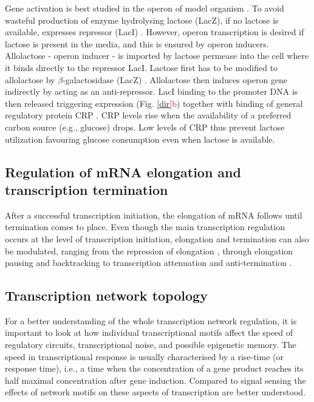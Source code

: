 Gene activation is best studied in the  operon of model organism .
To avoid wasteful production of enzyme hydrolysing lactose (LacZ), if no lactose is available,  expresses  repressor (LacI) \cite{hudson1990co}.
However,  operon transcription is desired if lactose is present in the media, and this is ensured by  operon inducers.
Allolactose -  operon inducer - is imported by lactose permease into the cell where it binds directly to the repressor LacI.
Lactose first has to be modified to allolactose by $\beta$-galactosidase (LacZ) \cite{jobe1972lac, wheatley2013structural}.
Allolactose then induces  operon gene indirectly by acting as an anti-repressor.
LacI binding to the promoter DNA is then released triggering  expression (Fig. \ref{dir}\textcolor{red}{b}) together with binding of general regulatory protein CRP \cite{hudson1990co, clark2005molecular}.
CRP levels rise when the availability of a preferred carbon source (e.g., glucose) drops.
Low levels of CRP thus prevent lactose utilization favouring glucose consumption even when lactose is available.

\subsection{Regulation of mRNA elongation and transcription termination}
After a successful transcription initiation, the elongation of mRNA follows until termination comes to place.
Even though the main transcription regulation occurs at the level of transcription initiation, elongation and termination can also be modulated, ranging from the repression of elongation \cite{monsalve1996protein}, through elongation pausing and backtracking \cite{mustaev2017transcription} to transcription attenuation and anti-termination \cite{naville2009transcription}.

\subsection{Transcription network topology}
For a better understanding of the whole transcription network regulation, it is important to look at how individual transcriptional motifs affect the speed of regulatory circuits, transcriptional noise, and possible epigenetic memory.
The speed in transcriptional response is usually characterised by a rise-time (or response time), i.e., a time when the concentration of a gene product reaches its half maximal concentration after gene induction.
Compared to signal sensing the effects of network motifs on these aspects of transcription are better understood.

